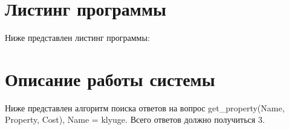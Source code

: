 \newpage
\section*{Листинг программы}
Ниже представлен листинг программы:


\section*{Описание работы системы}

Ниже представлен алгоритм поиска ответов на вопрос get\_property(Name, Property, Cost), Name = klyuge. Всего ответов должно получиться 3.
